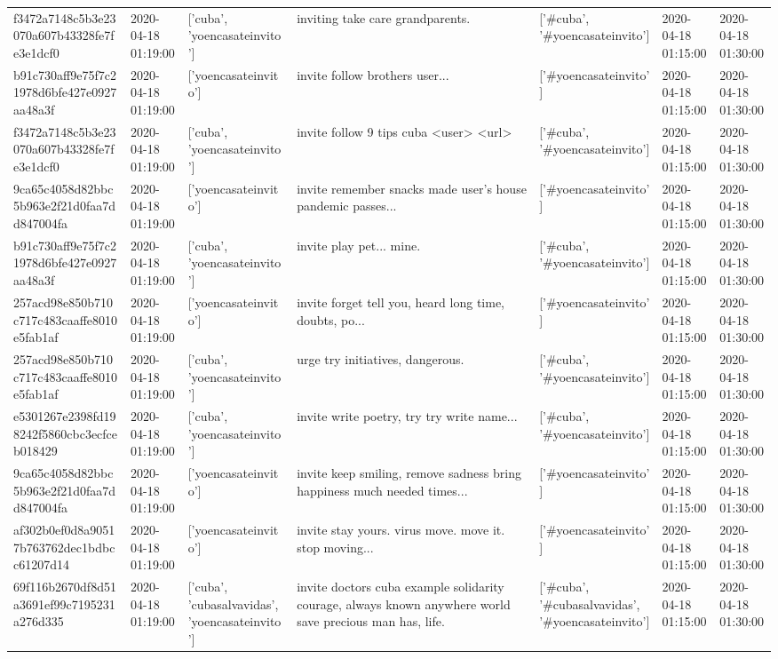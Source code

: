 \begin{tabular}{lllllll}
f3472a7148c5b3e23070a607b43328fe7fe3e1dcf0 & 2020-04-18 01:19:00 & ['cuba', 'yoencasateinvito'] & inviting take care grandparents. & ['#cuba', '#yoencasateinvito'] & 2020-04-18 01:15:00 & 2020-04-18 01:30:00 \\
b91c730aff9e75f7c21978d6bfe427e0927aa48a3f & 2020-04-18 01:19:00 & ['yoencasateinvito'] & invite follow brothers user... & ['#yoencasateinvito'] & 2020-04-18 01:15:00 & 2020-04-18 01:30:00 \\
f3472a7148c5b3e23070a607b43328fe7fe3e1dcf0 & 2020-04-18 01:19:00 & ['cuba', 'yoencasateinvito'] & invite follow 9️ tips cuba <user> <url> & ['#cuba', '#yoencasateinvito'] & 2020-04-18 01:15:00 & 2020-04-18 01:30:00 \\
9ca65c4058d82bbc5b963e2f21d0faa7dd847004fa & 2020-04-18 01:19:00 & ['yoencasateinvito'] & invite remember snacks made user's house pandemic passes... & ['#yoencasateinvito'] & 2020-04-18 01:15:00 & 2020-04-18 01:30:00 \\
b91c730aff9e75f7c21978d6bfe427e0927aa48a3f & 2020-04-18 01:19:00 & ['cuba', 'yoencasateinvito'] & invite play pet... mine. & ['#cuba', '#yoencasateinvito'] & 2020-04-18 01:15:00 & 2020-04-18 01:30:00 \\
257acd98e850b710c717c483caaffe8010e5fab1af & 2020-04-18 01:19:00 & ['yoencasateinvito'] & invite forget tell you, heard long time, doubts, po... & ['#yoencasateinvito'] & 2020-04-18 01:15:00 & 2020-04-18 01:30:00 \\
257acd98e850b710c717c483caaffe8010e5fab1af & 2020-04-18 01:19:00 & ['cuba', 'yoencasateinvito'] & urge try initiatives, dangerous. & ['#cuba', '#yoencasateinvito'] & 2020-04-18 01:15:00 & 2020-04-18 01:30:00 \\
e5301267e2398fd198242f5860cbc3ecfceb018429 & 2020-04-18 01:19:00 & ['cuba', 'yoencasateinvito'] & invite write poetry, try try write name... & ['#cuba', '#yoencasateinvito'] & 2020-04-18 01:15:00 & 2020-04-18 01:30:00 \\
9ca65c4058d82bbc5b963e2f21d0faa7dd847004fa & 2020-04-18 01:19:00 & ['yoencasateinvito'] & invite keep smiling, remove sadness bring happiness much needed times... & ['#yoencasateinvito'] & 2020-04-18 01:15:00 & 2020-04-18 01:30:00 \\
af302b0ef0d8a90517b763762dec1bdbcc61207d14 & 2020-04-18 01:19:00 & ['yoencasateinvito'] & invite stay yours. virus move. move it. stop moving... & ['#yoencasateinvito'] & 2020-04-18 01:15:00 & 2020-04-18 01:30:00 \\
69f116b2670df8d51a3691ef99c7195231a276d335 & 2020-04-18 01:19:00 & ['cuba', 'cubasalvavidas', 'yoencasateinvito'] & invite doctors cuba example solidarity courage, always known anywhere world save precious man has, life. & ['#cuba', '#cubasalvavidas', '#yoencasateinvito'] & 2020-04-18 01:15:00 & 2020-04-18 01:30:00 \\

\end{tabular}
